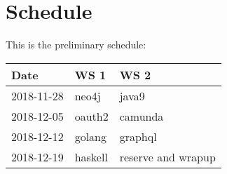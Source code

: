 \section*{Schedule}

This is the preliminary schedule:

\begin{center}
  \begin{tabular}{|l|l|l|}\hline
    \textbf{Date}& \textbf{WS 1}& \textbf{WS 2}\\\hline
    2018-11-28 & neo4j & java9\\\hline
    2018-12-05 & oauth2 & camunda \\\hline
    2018-12-12 & golang & graphql\\\hline
    2018-12-19 & haskell & reserve and wrapup\\\hline
  \end{tabular}
\end{center}

